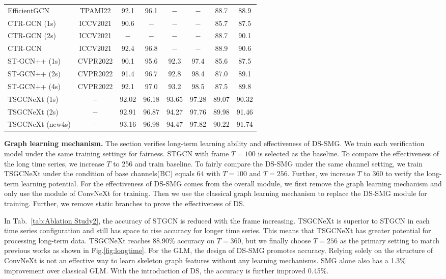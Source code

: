 \documentclass[10pt,twocolumn,letterpaper]{article}
\begin{document}
\begin{table*}
\begin{tabular}{lc|cc|cc|cc}
    EfficientGCN & TPAMI22 & 92.1  & 96.1  & $-$ & $-$ & 88.7  & 88.9 \\
    CTR-GCN (1s) & ICCV2021 & 90.6  & $-$ & $-$ & $-$ & 85.7  & 87.5  \\
    CTR-GCN (2s) & ICCV2021 & $-$ & $-$ & $-$ & $-$ & 88.7  & 90.1 \\
    CTR-GCN & ICCV2021 & 92.4  & 96.8  & $-$ & $-$ & 88.9  & 90.6 \\
    ST-GCN++ (1s) & CVPR2022 & 90.1  & 95.6  & 92.3  & 97.4  & 85.6  & 87.5  \\
    ST-GCN++ (2s) & CVPR2022 & 91.4  & 96.7  & 92.8  & 98.4  & 87.0  & 89.1 \\
    ST-GCN++ (4s) & CVPR2022 & 92.1  & 97.0  & 93.2  & \color{red}98.5  & 87.5  & 89.8 \\
    \midrule
    TSGCNeXt (1s) &  $-$    & 92.02 & 96.18 & 93.65 & 97.28 & 89.07 & 90.32\\
    TSGCNeXt (2s) & $-$     & 92.91 & 96.87 & 94.27 & 97.76 & 89.98 & 91.46\\
    TSGCNeXt (new4s) & $-$  & 93.16 & 96.98 & \color{red}94.47 & 97.82  & \color{red}90.22 & \color{red}91.74\\
    \bottomrule
    \end{tabular}\label{tab:finnal}\end{table*} 
\noindent\textbf{Graph learning mechanism.} The section verifies long-term learning ability and effectiveness of DS-SMG. We train each verification model under the same training settings for fairness. STGCN with frame $T=100$ is selected as the baseline. To compare the effectiveness of the long time series, we increase $T$ to 256 and train baseline. To fairly compare the DS-SMG under the same channel setting, we train TSGCNeXt under the condition of base channels(BC) equals $64$ with $T=100$ and $T=256$. Further, we increase $T$ to 360 to verify the long-term learning potential. For the effectiveness of DS-SMG comes from the overall module, we first remove the graph learning mechanism and only use the module of ConvNeXt for training. Then we use the classical graph learning mechanism to replace the DS-SMG module for training. Further, we remove static branches to prove the effectiveness of DS. 


 In Tab.~\ref{tab:Ablation Study2}, the accuracy of STGCN is reduced with the frame increasing. TSGCNeXt is superior to STGCN in each time series configuration and still has space to rise accuracy for longer time series. This means that TSGCNeXt has greater potential for processing long-term data. TSGCNeXt reaches 88.90\% accuracy on $T=360$, but we finally choose $T=256$ as the primary setting to match previous works as shown in Fig.\ref{fig:longtime}. For the GLM, the design of DS-SMG promotes accuracy. Relying solely on the structure of ConvNeXt is not an effective way to learn skeleton graph features without any learning mechanisms. SMG alone also has a 1.3\% improvement over classical GLM. With the introduction of DS, the accuracy is further improved 0.45\%.
\end{document}
